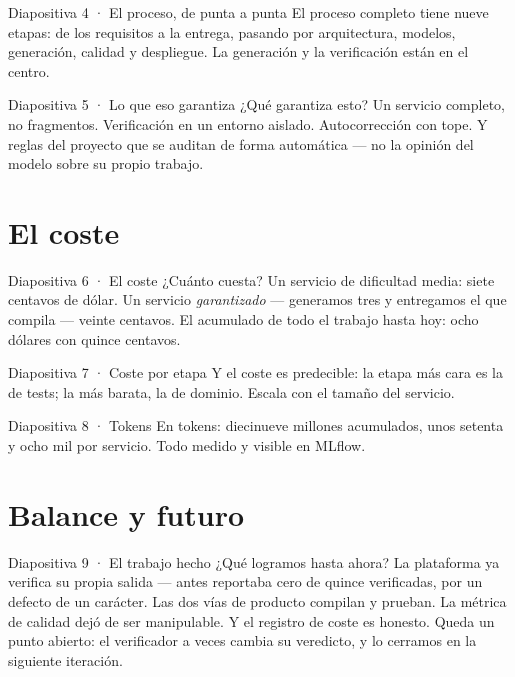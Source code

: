 \documentclass[11pt,a4paper]{article}
\begin{document}
\begin{slide}{Diapositiva 4 · El proceso, de punta a punta}
El proceso completo tiene nueve etapas: de los requisitos a la entrega, pasando por
arquitectura, modelos, generación, calidad y despliegue. La generación y la
verificación están en el centro.
\end{slide}

\begin{slide}{Diapositiva 5 · Lo que eso garantiza}
¿Qué garantiza esto? Un servicio completo, no fragmentos. Verificación en un entorno
aislado. Autocorrección con tope. Y reglas del proyecto que se auditan de forma
automática --- no la opinión del modelo sobre su propio trabajo.
\end{slide}

\section*{El coste}

\begin{slide}{Diapositiva 6 · El coste}
¿Cuánto cuesta? Un servicio de dificultad media: siete centavos de dólar. Un servicio
\emph{garantizado} --- generamos tres y entregamos el que compila --- veinte centavos.
El acumulado de todo el trabajo hasta hoy: ocho dólares con quince centavos.
\end{slide}

\begin{slide}{Diapositiva 7 · Coste por etapa}
Y el coste es predecible: la etapa más cara es la de tests; la más barata, la de
dominio. Escala con el tamaño del servicio.
\end{slide}

\begin{slide}{Diapositiva 8 · Tokens}
En tokens: diecinueve millones acumulados, unos setenta y ocho mil por servicio. Todo
medido y visible en MLflow.
\end{slide}

\section*{Balance y futuro}

\begin{slide}{Diapositiva 9 · El trabajo hecho}
¿Qué logramos hasta ahora? La plataforma ya verifica su propia salida --- antes
reportaba cero de quince verificadas, por un defecto de un carácter. Las dos vías de
producto compilan y prueban. La métrica de calidad dejó de ser manipulable. Y el
registro de coste es honesto. Queda un punto abierto: el verificador a veces cambia
su veredicto, y lo cerramos en la siguiente iteración.
\end{slide}
\end{document}
